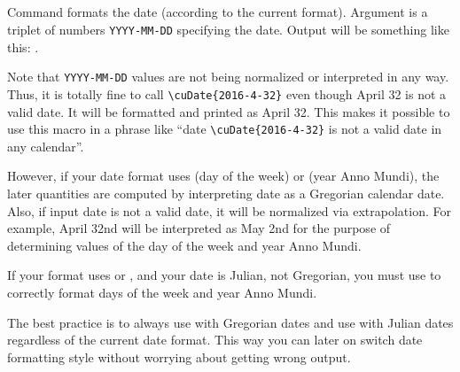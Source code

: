 \begin{EN}
\subsection{}
Command formats the date (according to the current format). Argument is a triplet of numbers \texttt{YYYY-MM-DD} specifying
the date. Output will be something like this: .

Note that \texttt{YYYY-MM-DD} values are not being normalized or interpreted in any way. Thus, it is totally fine to
call \verb+\cuDate{2016-4-32}+ even though April 32 is not a valid date. It will be formatted and printed as April 32. This
makes it possible to use this macro in a phrase like ``date \verb+\cuDate{2016-4-32}+ is not a valid date in any calendar''.

However, if your date format uses  (day of the week) or  (year Anno Mundi), the later quantities are computed by
interpreting date as a Gregorian calendar date. Also, if input date is not a valid date, it will be normalized via extrapolation.
For example, April 32nd will be interpreted as May 2nd for the purpose of determining values of the day of the week and year Anno Mundi.

If your format uses  or , and your date is Julian, not Gregorian, you must use  to
correctly format days of the week and year Anno Mundi.

The best practice is to always use  with Gregorian dates and use  with Julian dates regardless
of the current date format. This way you can later on switch date formatting style without worrying about getting wrong output.
\end{EN}

